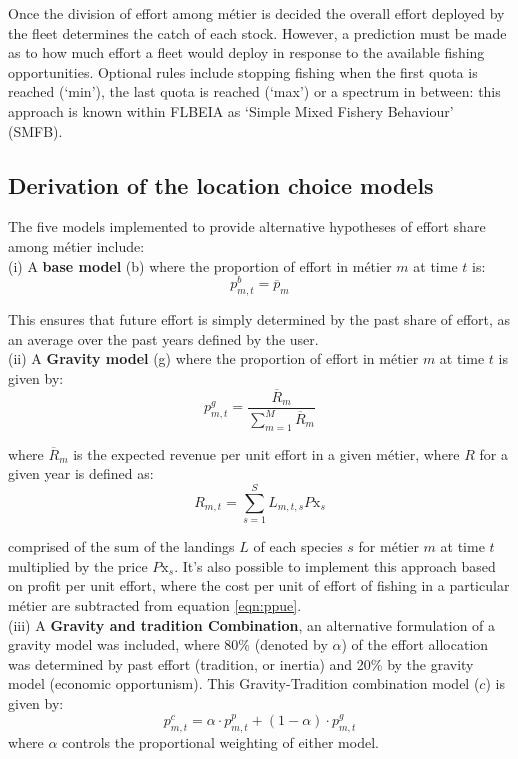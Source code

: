 \documentclass[12pt, halfline, a4paper]{ouparticle}
\begin{document}
Once the division of effort among métier is decided the overall effort deployed
by the fleet determines the catch of each stock. However, a prediction must be
made as to how much effort a fleet would deploy in response to the available
fishing opportunities. Optional rules include stopping fishing when the first
quota is reached (`min'), the last quota is reached (`max') or a spectrum in
between: this approach is known within FLBEIA as `Simple Mixed Fishery
Behaviour' (SMFB).

\subsection{Derivation of the location choice models}

The five models implemented to provide alternative hypotheses of effort share
among métier include:\\

(i) A \textbf{base model} (b) where the proportion of effort in métier $m$ at time
$t$ is:
\begin{equation}
p^{b}_{m,t} = \overline{p}_{m}
\end{equation}

This ensures that future effort is simply determined by the past share of
effort, as an average over the past years defined by the user. \\

(ii) A \textbf{Gravity model} (g) where the proportion of effort in métier $m$ at
time $t$ is given by: 
\begin{equation}
p^{g}_{m,t} = \frac{\overline{R}_{m}}{\sum\limits_{m=1}^{M}\overline{R}_{m}} 
\end{equation}

where $\overline{R}_m$ is the expected revenue per unit effort in a given
métier, where $R$ for a given year is defined as: 
\begin{equation}
R_{m,t} =  \sum\limits_{s=1}^{S} L_{m,t,s} P\text{x}_{s} 
\label{eqn:ppue}
\end{equation}

comprised of the sum of the landings $L$ of each species $s$ for métier $m$ at
time $t$ multiplied by the price $P\text{x}_{s}$. It's also possible to
implement this approach based on profit per unit effort, where the cost per
unit of effort of fishing in a particular métier are subtracted from equation
\ref{eqn:ppue}. \\

(iii) A \textbf{Gravity and tradition Combination}, an alternative formulation
of a gravity model was included, where 80\% (denoted by $\alpha$) of the effort
allocation was determined by past effort (tradition, or inertia) and 20\% by
the gravity model (economic opportunism). This Gravity-Tradition combination
model ($c$) is given by:
\begin{equation}
	p^{c}_{m,t} = \alpha \cdot p^{p}_{m,t} + (1 - \alpha) \cdot p^{g}_{m,t}
\end{equation}
where $\alpha$ controls the proportional weighting of either model. \\ 
\end{document}
